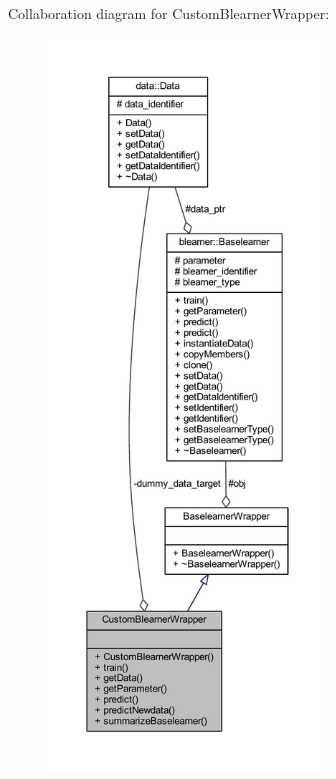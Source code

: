 Collaboration diagram for Custom\+Blearner\+Wrapper\+:\nopagebreak
\begin{figure}[H]
\begin{center}
\leavevmode
\includegraphics[height=550pt]{class_custom_blearner_wrapper__coll__graph}
\end{center}
\end{figure}
